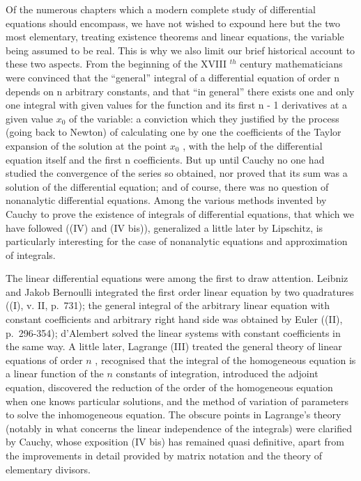 Of the numerous chapters which a modern complete study of differential equations should encompass, we have not wished to expound here but the two most elementary, treating existence theorems and linear equations, the variable being assumed to be real. This is why we also limit our brief historical account to these two aspects. From the beginning of the XVIII \(^{th}\) century mathematicians were convinced that the ``general'' integral of a differential equation of order n depends on n arbitrary constants, and that ``in general'' there exists one and only one integral with given values for the function and its first n - 1 derivatives at a given value \(x_{0}\) of the variable: a conviction which they justified by the process (going back to Newton) of calculating one by one the coefficients of the Taylor expansion of the solution at the point \(x_{0}\) , with the help of the differential equation itself and the first n coefficients. But up until Cauchy no one had studied the convergence of the series so obtained, nor proved that its sum was a solution of the differential equation; and of course, there was no question of nonanalytic differential equations. Among the various methods invented by Cauchy to prove the existence of integrals of differential equations, that which we have followed ((IV) and (IV bis)), generalized a little later by Lipschitz, is particularly interesting for the case of nonanalytic equations and approximation of integrals.

The linear differential equations were among the first to draw attention. Leibniz and Jakob Bernoulli integrated the first order linear equation by two quadratures ((I), v. II, p.~731); the general integral of the arbitrary linear equation with constant coefficients and arbitrary right hand side was obtained by Euler ((II), p.~296-354); d'Alembert solved the linear systems with constant coefficients in the same way. A little later, Lagrange (III) treated the general theory of linear equations of order \(n\) , recognised that the integral of the homogeneous equation is a linear function of the \(n\) constants of integration, introduced the adjoint equation, discovered the reduction of the order of the homogeneous equation when one knows particular solutions, and the method of variation of parameters to solve the inhomogeneous equation. The obscure points in Lagrange's theory (notably in what concerns the linear independence of the integrals) were clarified by Cauchy, whose exposition (IV bis) has remained quasi definitive, apart from the improvements in detail provided by matrix notation and the theory of elementary divisors.

